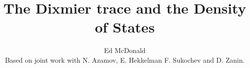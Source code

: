 \documentclass{beamer}
\newcommand\makebeamertitle{\frame{\maketitle}}%
\numberwithin{equation}{section}
\theoremstyle{plain}
\theoremstyle{plain}
\theoremstyle{definition}
\theoremstyle{plain}
\theoremstyle{plain}
\theoremstyle{definition}
\begin{document}
\title[The Dixmier trace and the DOS]{The Dixmier trace and the Density of States}


\author[E. McDonald]{Ed McDonald\\
Based on joint work with N. Azamov, E. Hekkelman F. Sukochev and D. Zanin.}




\makebeamertitle
\end{document}
